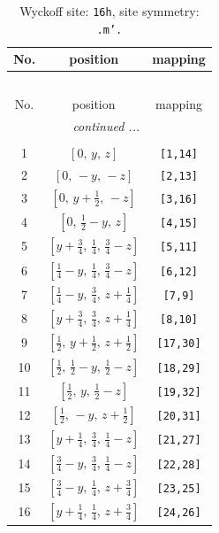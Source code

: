 \documentclass[fleqn,8pt]{jsarticle}
\begin{document}
\renewcommand{\arraystretch}{1.2}
\begin{longtable}{ccc}
\caption{Wyckoff site: {\tt 16h}, site symmetry: {\tt .m'.}}
 \\
 \hline \hline
No. & position & mapping \\ \hline \endfirsthead

\multicolumn{2}{l}{\tablename\ \thetable{}} \\
 \hline \hline
No. & position & mapping \\ \hline \endhead

 \hline \hline
\multicolumn{2}{r}{\footnotesize\it continued ...} \\ \endfoot

 \hline \hline
\multicolumn{2}{r}{} \\ \endlastfoot

1 & $\left[ 0,\, y,\, z \right]$ & {\tt [1,14]} \\ \hline
2 & $\left[ 0,\, - y,\, - z \right]$ & {\tt [2,13]} \\ \hline
3 & $\left[ 0,\, y + \frac{1}{2},\, - z \right]$ & {\tt [3,16]} \\ \hline
4 & $\left[ 0,\, \frac{1}{2} - y,\, z \right]$ & {\tt [4,15]} \\ \hline
5 & $\left[ y + \frac{3}{4},\, \frac{1}{4},\, \frac{3}{4} - z \right]$ & {\tt [5,11]} \\ \hline
6 & $\left[ \frac{1}{4} - y,\, \frac{1}{4},\, \frac{3}{4} - z \right]$ & {\tt [6,12]} \\ \hline
7 & $\left[ \frac{1}{4} - y,\, \frac{3}{4},\, z + \frac{1}{4} \right]$ & {\tt [7,9]} \\ \hline
8 & $\left[ y + \frac{3}{4},\, \frac{3}{4},\, z + \frac{1}{4} \right]$ & {\tt [8,10]} \\ \hline
9 & $\left[ \frac{1}{2},\, y + \frac{1}{2},\, z + \frac{1}{2} \right]$ & {\tt [17,30]} \\ \hline
10 & $\left[ \frac{1}{2},\, \frac{1}{2} - y,\, \frac{1}{2} - z \right]$ & {\tt [18,29]} \\ \hline
11 & $\left[ \frac{1}{2},\, y,\, \frac{1}{2} - z \right]$ & {\tt [19,32]} \\ \hline
12 & $\left[ \frac{1}{2},\, - y,\, z + \frac{1}{2} \right]$ & {\tt [20,31]} \\ \hline
13 & $\left[ y + \frac{1}{4},\, \frac{3}{4},\, \frac{1}{4} - z \right]$ & {\tt [21,27]} \\ \hline
14 & $\left[ \frac{3}{4} - y,\, \frac{3}{4},\, \frac{1}{4} - z \right]$ & {\tt [22,28]} \\ \hline
15 & $\left[ \frac{3}{4} - y,\, \frac{1}{4},\, z + \frac{3}{4} \right]$ & {\tt [23,25]} \\ \hline
16 & $\left[ y + \frac{1}{4},\, \frac{1}{4},\, z + \frac{3}{4} \right]$ & {\tt [24,26]} \\
\end{longtable}
\end{document}
